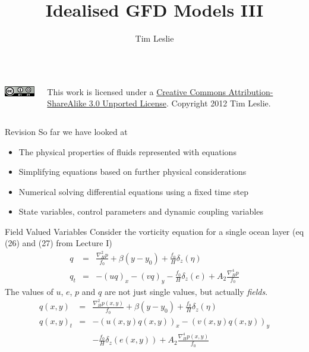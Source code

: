 \documentclass[a4paper]{beamer}
\title{Idealised GFD Models III}
\author{Tim Leslie}\institute{Breakaway Consulting Pty. Ltd.\\Climate Change Research Centre}
\begin{document}
\begin{frame}
\titlepage
\begin{columns}
    \begin{column}{0.25\textwidth}
      \includegraphics[keepaspectratio]{CC-BY-SA.png}
    \end{column}
    \begin{column}{0.75\textwidth}
      This work is licensed under a \href{http://creativecommons.org/licenses/by-sa/3.0/}{Creative Commons Attribution-ShareAlike 3.0 Unported License}. Copyright 2012 Tim Leslie.
    \end{column}
\end{columns}
\end{frame}

\begin{frame}{Revision}
So far we have looked at
\begin{itemize}
\item The physical properties of fluids represented with equations
\item Simplifying equations based on further physical considerations
\item Numerical solving differential equations using a fixed time step
\item State variables, control parameters and dynamic coupling variables
\end{itemize}
\end{frame}

\begin{frame}{Field Valued Variables}
Consider the vorticity equation for a single ocean layer (eq (26) and (27) from Lecture I)
\begin{eqnarray}
q  &    =   & \frac{\nabla^2_Hp}{f_0} + \beta(y - y_0) + \frac{f_0}{H}\delta_z(\eta)\\
q_t & = & - \left(uq\right)_x - \left(vq\right)_y  -\frac{f_0}{H}\delta_z(e)+ A_2\frac{\nabla^4_Hp}{f_0}
\end{eqnarray}
The values of $u$, $e$, $p$ and $q$ are not just single values, but actually \emph{fields}.
\begin{eqnarray}
q(x,y)  &    =   & \frac{\nabla^2_Hp(x,y)}{f_0} + \beta(y - y_0) + \frac{f_0}{H}\delta_z(\eta)\\
q(x,y)_t & = & - \left(u(x,y)q(x,y)\right)_x - \left(v(x,y)q(x,y)\right)_y \nonumber\\
         &   & -\frac{f_0}{H}\delta_z(e(x,y))+ A_2\frac{\nabla^4_Hp(x,y)}{f_0}
\end{eqnarray}
\end{frame}
\end{document}
